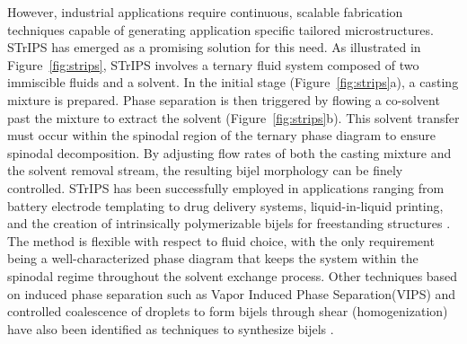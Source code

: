 However, industrial applications require continuous, scalable fabrication techniques capable of generating application specific tailored microstructures. STrIPS has emerged as a promising solution 
for this need. As illustrated in Figure~\ref{fig:strips}, STrIPS involves a ternary fluid system composed of two immiscible fluids 
and a solvent. In the initial stage (Figure~\ref{fig:strips}a), a casting mixture is prepared. Phase separation is then triggered by flowing a co-solvent past the mixture to extract the solvent 
(Figure~\ref{fig:strips}b). This solvent transfer must occur within the spinodal region of the ternary phase diagram to ensure spinodal decomposition. By adjusting flow rates of both the casting 
mixture and the solvent removal stream, the resulting bijel morphology can be finely controlled. STrIPS has been successfully employed in applications ranging from battery electrode templating to drug 
delivery systems, liquid-in-liquid printing, and the creation of intrinsically polymerizable bijels for freestanding structures 
\cite{garcia_scalable_2019, thorson_bijel-templated_2019, amirfattahi_fabrication_2024, ching_rapid_2021}. The method is flexible with respect to fluid choice, with 
the only requirement being a well-characterized phase diagram that keeps the system within the spinodal regime throughout the solvent exchange process. Other techniques based on
induced phase separation such as Vapor Induced Phase Separation(VIPS) and controlled coalescence of droplets to form bijels through shear (homogenization) have also been identified as techniques
to synthesize bijels \cite{wang_scalable_2020, huang_bicontinuous_2017}.

